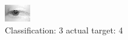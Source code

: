 \begin{figure}[h!]
\begin{center}
\includegraphics[width=0.60\columnwidth]{figures/ID2677_class_3_target_4.png}
\end{center}
\caption{ Classification: 3 actual target: 4}
\label{fig:ID2677_class_3_target_4}
\end{figure}
